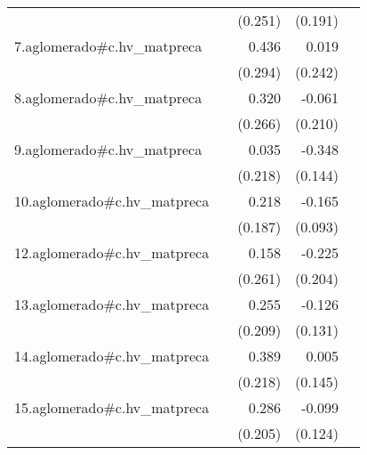 {\begin{longtable}{l*{4}{D{.}{.}{-1}}}
            &                     &     (0.251)         &     (0.191)         &                     \\
\addlinespace
7.aglomerado#c.hv\_matpreca&                     &       0.436         &       0.019         &                     \\
            &                     &     (0.294)         &     (0.242)         &                     \\
\addlinespace
8.aglomerado#c.hv\_matpreca&                     &       0.320         &      -0.061         &                     \\
            &                     &     (0.266)         &     (0.210)         &                     \\
\addlinespace
9.aglomerado#c.hv\_matpreca&                     &       0.035         &      -0.348\sym{*}  &                     \\
            &                     &     (0.218)         &     (0.144)         &                     \\
\addlinespace
10.aglomerado#c.hv\_matpreca&                     &       0.218         &      -0.165         &                     \\
            &                     &     (0.187)         &     (0.093)         &                     \\
\addlinespace
12.aglomerado#c.hv\_matpreca&                     &       0.158         &      -0.225         &                     \\
            &                     &     (0.261)         &     (0.204)         &                     \\
\addlinespace
13.aglomerado#c.hv\_matpreca&                     &       0.255         &      -0.126         &                     \\
            &                     &     (0.209)         &     (0.131)         &                     \\
\addlinespace
14.aglomerado#c.hv\_matpreca&                     &       0.389         &       0.005         &                     \\
            &                     &     (0.218)         &     (0.145)         &                     \\
\addlinespace
15.aglomerado#c.hv\_matpreca&                     &       0.286         &      -0.099         &                     \\
            &                     &     (0.205)         &     (0.124)         &                     \\

\end{longtable}}
